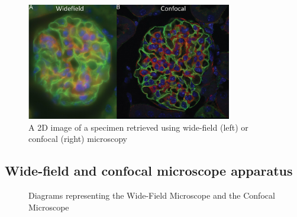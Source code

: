 
\begin{figure}
    \centering
    \includegraphics[width=0.8\textwidth]{figs/A-confocal-microscope-allows-you-to-do-optical-sectioning-in-thick-specimens-by-removing.png}
    \caption[A 2D image of a specimen retrieved using wide-field (left) or confocal (right) microscopy]{A 2D image of a specimen retrieved using wide-field (left) or confocal (right) microscopy \cite{specimenConfocalFig}}
    \label{fig:widevsconfocalfig}
\end{figure}

\subsection{Wide-field and confocal microscope apparatus}\label{sec:MicroAppa}
\begin{figure}[h!]
    \centering
    \caption[Diagrams representing the Wide-Field Microscope and the Confocal Microscope]{Diagrams representing the Wide-Field Microscope and the Confocal Microscope \cite{Sanderson-2014}}
    \label{fig:microscope_diagrams}
\end{figure}

